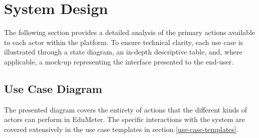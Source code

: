 \section{System Design}
The following section provides a detailed analysis of the primary actions available to each actor within the platform. To ensure technical clarity, each use case is illustrated through a state diagram, an in-depth descriptive table, and, where applicable, a mock-up representing the interface presented to the end-user.

\subsection{Use Case Diagram}
The presented diagram covers the entirety of actions that the different kinds of actors can perform in EduMeter. The specific interactions with the system are covered extensively in the use case templates in section \ref{use-case-templates}.

\vspace{1em}
	

